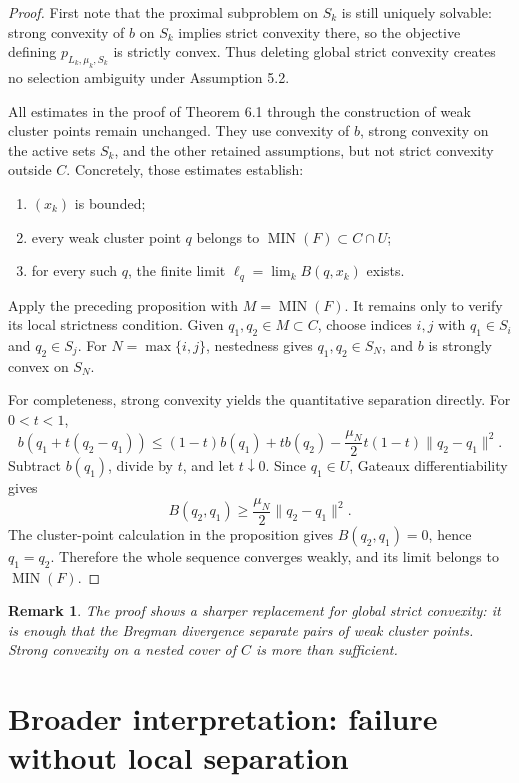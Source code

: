 \documentclass[11pt]{article}
\newtheorem*{remark}{Remark}
\newcommand{\MIN}{\operatorname{MIN}}
\begin{document}
\begin{proof}
First note that the proximal subproblem on \(S_k\) is still uniquely solvable:
strong convexity of \(b\) on \(S_k\) implies strict convexity there, so the
objective defining \(p_{L_k,\mu_k,S_k}\) is strictly convex. Thus deleting
global strict convexity creates no selection ambiguity under Assumption 5.2.

All estimates in the proof of Theorem 6.1 through the construction of weak
cluster points remain unchanged. They use convexity of \(b\), strong convexity
on the active sets \(S_k\), and the other retained assumptions, but not strict
convexity outside \(C\). Concretely, those estimates establish:
\begin{enumerate}[label=(\roman*),leftmargin=*]
\item \((x_k)\) is bounded;
\item every weak cluster point \(q\) belongs to \(\MIN(F)\subset C\cap U\);
\item for every such \(q\), the finite limit
      \(\ell_q=\lim_k B(q,x_k)\) exists.
\end{enumerate}

Apply the preceding proposition with \(M=\MIN(F)\). It remains only to verify
its local strictness condition. Given \(q_1,q_2\in M\subset C\), choose
indices \(i,j\) with \(q_1\in S_i\) and \(q_2\in S_j\). For
\(N=\max\{i,j\}\), nestedness gives \(q_1,q_2\in S_N\), and \(b\) is strongly
convex on \(S_N\).

For completeness, strong convexity yields the quantitative separation
directly. For \(0<t<1\),
\[
b(q_1+t(q_2-q_1))
\leq (1-t)b(q_1)+t b(q_2)
-\frac{\mu_N}{2}t(1-t)\lVert q_2-q_1\rVert^2.
\]
Subtract \(b(q_1)\), divide by \(t\), and let \(t\downarrow0\). Since
\(q_1\in U\), Gateaux differentiability gives
\[
B(q_2,q_1)
\geq \frac{\mu_N}{2}\lVert q_2-q_1\rVert^2.
\]
The cluster-point calculation in the proposition gives
\(B(q_2,q_1)=0\), hence \(q_1=q_2\). Therefore the whole sequence converges
weakly, and its limit belongs to \(\MIN(F)\).
\end{proof}

\begin{remark}
The proof shows a sharper replacement for global strict convexity: it is
enough that the Bregman divergence separate pairs of weak cluster points.
Strong convexity on a nested cover of \(C\) is more than sufficient.
\end{remark}

\section*{Broader interpretation: failure without local separation}
\end{document}

